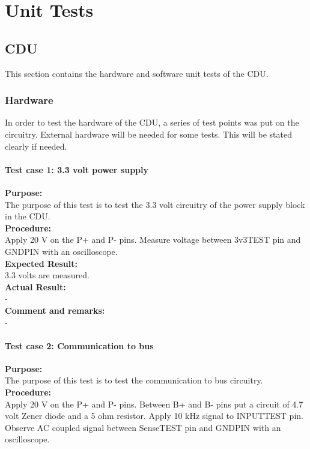 \chapter{Unit Tests}
\section{CDU}
This section contains the hardware and software unit tests of the CDU.
\subsection{Hardware}
In order to test the hardware of the CDU, a series of test points was put on the circuitry. External hardware will be needed for some tests. This will be stated clearly if needed.
\subsubsection{Test case 1: 3.3 volt power supply}
\textbf{Purpose:}\\
The purpose of this test is to test the 3.3 volt circuitry of the power supply block in the CDU.\\

\textbf{Procedure:}\\
Apply 20 V on the P+ and P- pins. Measure voltage between 3v3TEST pin and GNDPIN with an oscilloscope.\\

\textbf{Expected Result:}\\
3.3 volts are measured.\\

\textbf{Actual Result:}\\
-\\

\textbf{Comment and remarks:}\\
-\\

\subsubsection{Test case 2: Communication to bus}
\textbf{Purpose:}\\
The purpose of this test is to test the communication to bus circuitry.\\

\textbf{Procedure:}\\
Apply 20 V on the P+ and P- pins. Between B+ and B- pins put a circuit of 4.7 volt Zener diode and a 5 ohm resistor. Apply 10 kHz signal to INPUTTEST pin. Observe AC coupled signal between SenseTEST pin and GNDPIN with an oscilloscope.\\

